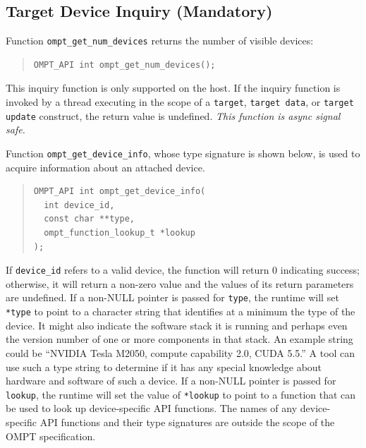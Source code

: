 \documentclass{article}
\begin{document}
\subsection{Target Device Inquiry (Mandatory)}
\label{sec:target-region}
Function \verb|ompt_get_num_devices| returns the number of visible devices:
\begin{quote}
\begin{verbatim}
OMPT_API int ompt_get_num_devices();
\end{verbatim}
\end{quote}
This inquiry function is only supported on the host. If the inquiry function is invoked by a thread executing in the scope of a {\tt target}, {\tt target data}, or {\tt target update} construct, the return value is undefined. {\it This function is async signal safe.}

Function \verb|ompt_get_device_info|, whose type signature is shown below, is used to acquire information about an attached device. 
\begin{quote}
\begin{verbatim}
OMPT_API int ompt_get_device_info(
  int device_id, 
  const char **type, 
  ompt_function_lookup_t *lookup
);
\end{verbatim}
\end{quote}
If \verb|device_id| refers to a valid device, the function will return 0 indicating success; otherwise, it will return a non-zero value and the values of its return parameters are undefined. If a non-NULL pointer is passed for \verb|type|, the runtime will set \verb|*type| to point to a character string that identifies at a minimum the  type of the device. It might also indicate the software stack it is running and perhaps even the version number of one or more components in that stack. An example string could be ``NVIDIA Tesla M2050, compute capability 2.0, CUDA 5.5.'' A tool can use such a type string to determine if it has any special knowledge about hardware and software of such a device. If a non-NULL pointer is passed for \verb|lookup|, the runtime will set the value of \verb|*lookup| to point to a function that can be used to look up device-specific API functions.  The names of any device-specific API functions and their type signatures are outside the scope of the OMPT specification. 

\end{document}
